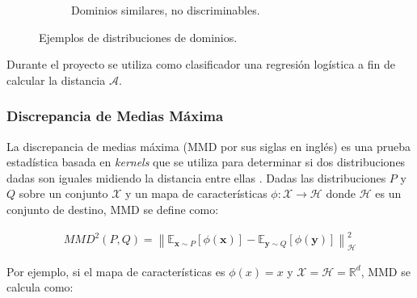 \begin{figure}[H]
\begin{subfigure}[h]{0.46\textwidth}

        \caption{Dominios similares, no discriminables.}
        \label{fig:dominios-similares}
    \end{subfigure}

    \caption[Ejemplos de distribuciones de dominios]{Ejemplos de distribuciones de dominios.}
    \label{fig:ejemplos-dist-a}
\end{figure}

Durante el proyecto se utiliza como clasificador una regresión logística a fin de calcular la distancia $\mathcal{A}$.

\subsubsection{Discrepancia de Medias Máxima}

La discrepancia de medias máxima (MMD por sus siglas en inglés) es una prueba estadística basada en {\it kernels} que
se utiliza para determinar si dos distribuciones dadas son iguales midiendo la distancia entre ellas \parencite{gretton2012kernel}. Dadas las distribuciones $P$ y $Q$ sobre un conjunto $\mathcal{X}$ y un mapa de
características $\phi : \mathcal{X} \rightarrow \mathcal{H}$ donde $\mathcal{H}$ es un conjunto de destino, MMD se
define como:

\begin{align}
    MMD^2(P, Q) = \left\lVert \mathbb{E}_{\mathbf{x} \sim P}[\phi(\mathbf{x})] - \mathbb{E}_{\mathbf{y} \sim Q}[\phi(\mathbf{y})]\right\rVert_{\mathcal{H}}^2
    \label{eq:mmd}
\end{align}

\noindent
Por ejemplo, si el mapa de características es $\phi(x)=x$ y $\mathcal{X}=\mathcal{H}=\mathbb{R}^d$, MMD se calcula
como:

